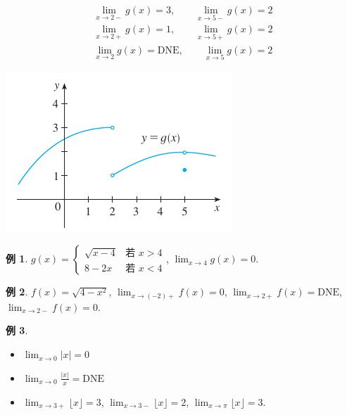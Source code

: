\documentclass[12pt]{extarticle}
\newcommand{\ds}{\displaystyle}
\newcommand{\floor}[1]{\lfloor #1 \rfloor}
\theoremstyle{definition}
\newtheorem*{ex}{例}
\begin{document}
\vspace{-3mm}
\hspace{1cm}
\begin{minipage}{0.4\textwidth}
  \begin{align*}
    \lim_{x\to2-}g(x) = 3,\qquad\lim_{x\to5-}g(x) = 2 \\
    \lim_{x\to2+}g(x) = 1,\qquad\lim_{x\to5+}g(x) = 2 \\
    \lim_{x\to2}g(x) = \text{DNE},\qquad\lim_{x\to5}g(x) = 2
  \end{align*}
\end{minipage}
\begin{minipage}{0.6\textwidth}
  \begin{center}
    \includegraphics[scale=1.,page=1]{fig/g.pdf}
  \end{center}
\end{minipage}

\begin{ex}
  $\ds g(x) = \begin{cases}\sqrt{x - 4} & \text{若 } x > 4 \\ 8 - 2x & \text{若 } x < 4 \end{cases}$, $\ds\lim_{x\to 4}g(x) = 0$. 
\end{ex}

\begin{ex}
  $\ds f(x) = \sqrt{4 - x^2}$, $\ds\lim_{x\to(-2)+}f(x) = 0$, $\ds\lim_{x\to2+}f(x) = \text{DNE}$, $\ds\lim_{x\to2-}f(x) = 0$. 
\end{ex}

\begin{ex}
  \setlength{\columnsep}{-30mm}
  \begin{multicols}{3}
    \begin{itemize}\setlength\itemsep{0em}
      \item $\ds\lim_{x\to0}|x| = 0$
      \item $\ds\lim_{x\to0}\frac{|x|}{x} = \text{DNE}$
      \item $\ds\lim_{x\to3+}\floor{x} = 3$, $\ds\lim_{x\to3-}\floor{x} = 2$, $\ds\lim_{x\to\pi}\floor{x} = 3$. 
    \end{itemize}
  \end{multicols}
\end{ex}
\end{document}
